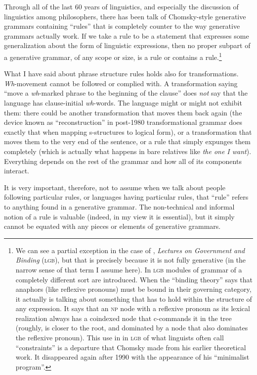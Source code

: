 \documentclass[output=paper]{langscibook}
\begin{document}
Through all of the last 60 years of linguistics, and especially the discussion of linguistics among philosophers, there has been talk of Chomsky-style generative grammars containing ``rules'' that is completely counter to the way generative grammars actually work. If we take a rule to be a statement that expresses some generalization about the form of linguistic expressions, then no proper subpart of a generative grammar, of any scope or size, is a rule or contains a rule.\footnote{We can see a partial exception in the case of \citet{Chomsky81}, \textit{Lectures on Government and Binding} (\textsc{lgb}), but that is precisely because it is not fully generative (in the narrow sense of that term I assume here). In \textsc{lgb} modules of grammar of a completely different sort are introduced. When the ``binding theory'' says that anaphors (like reflexive pronouns) must be bound in their governing category, it actually is talking about something that has to hold within the structure of any expression. It says that an \textsc{np} node with a reflexive pronoun as its lexical realization always has a coindexed node that c-commands it in the tree (roughly, is closer to the root, and dominated by a node that also dominates the reflexive pronoun).  This use in in \textsc{lgb} of what linguists often call ``constraints'' is a departure that Chomsky made from his earlier theoretical work. It disappeared again after 1990 with the appearance of his ``minimalist program''.}

What I have said about phrase structure rules holds also for transformations. \textit{Wh}-movement cannot be followed or complied with. A transformation saying ``move a \textit{wh}-marked phrase to the beginning of the clause'' does \emph{not} say that the language has clause-initial \textit{wh}-words. The language might or might not exhibit them: there could be another transformation that moves them back again (the device known as ``reconstruction'' in post-1980 transformational grammar does exactly that when mapping s-structures to logical form), or a transformation that moves them to the very end of the sentence, or a rule that simply expunges them completely (which is actually what happens in bare relatives like \textit{the one I want}). Everything depends on the rest of the grammar and how all of its components interact.

It is very important, therefore, not to assume when we talk about people following particular rules, or languages having particular rules, that ``rule'' refers to anything found in a generative grammar. The non-technical and informal notion of a rule is valuable (indeed, in my view it is essential), but it simply cannot be equated with any pieces or elements of generative grammars.
\end{document}
